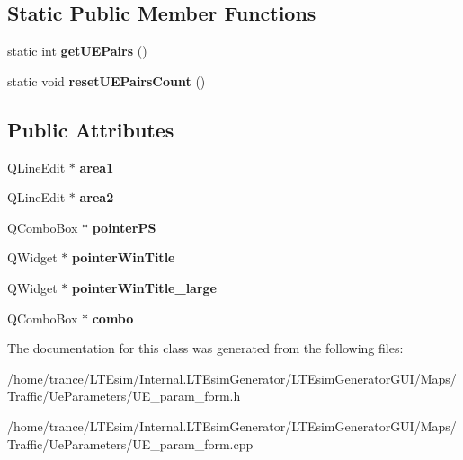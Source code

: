 \subsection*{Static Public Member Functions}
\begin{DoxyCompactItemize}
\item 
static int {\bfseries get\+U\+E\+Pairs} ()\hypertarget{class_form_a0450ccaddd3966be1b406167d1133739}{}\label{class_form_a0450ccaddd3966be1b406167d1133739}

\item 
static void {\bfseries reset\+U\+E\+Pairs\+Count} ()\hypertarget{class_form_ad56749806ce3cbddcbbda8c6efc8f79a}{}\label{class_form_ad56749806ce3cbddcbbda8c6efc8f79a}

\end{DoxyCompactItemize}
\subsection*{Public Attributes}
\begin{DoxyCompactItemize}
\item 
Q\+Line\+Edit $\ast$ {\bfseries area1}\hypertarget{class_form_aa6fff22a43be8b373d6a645a98b2a552}{}\label{class_form_aa6fff22a43be8b373d6a645a98b2a552}

\item 
Q\+Line\+Edit $\ast$ {\bfseries area2}\hypertarget{class_form_ae314659e50fb228cf30b9190bba945f2}{}\label{class_form_ae314659e50fb228cf30b9190bba945f2}

\item 
Q\+Combo\+Box $\ast$ {\bfseries pointer\+PS}\hypertarget{class_form_a58bdc0004144ecbd0cee33ae2a5b00c8}{}\label{class_form_a58bdc0004144ecbd0cee33ae2a5b00c8}

\item 
Q\+Widget $\ast$ {\bfseries pointer\+Win\+Title}\hypertarget{class_form_ab5ee7645699f72aa22d1787434f6b647}{}\label{class_form_ab5ee7645699f72aa22d1787434f6b647}

\item 
Q\+Widget $\ast$ {\bfseries pointer\+Win\+Title\+\_\+large}\hypertarget{class_form_ae745c744f4244f8a33ac804c8028af7d}{}\label{class_form_ae745c744f4244f8a33ac804c8028af7d}

\item 
Q\+Combo\+Box $\ast$ {\bfseries combo}\hypertarget{class_form_a8b03dc7e2564f1aeb7b0eb688f0e0655}{}\label{class_form_a8b03dc7e2564f1aeb7b0eb688f0e0655}

\end{DoxyCompactItemize}


The documentation for this class was generated from the following files\+:\begin{DoxyCompactItemize}
\item 
/home/trance/\+L\+T\+Esim/\+Internal.\+L\+T\+Esim\+Generator/\+L\+T\+Esim\+Generator\+G\+U\+I/\+Maps/\+Traffic/\+Ue\+Parameters/U\+E\+\_\+param\+\_\+form.\+h\item 
/home/trance/\+L\+T\+Esim/\+Internal.\+L\+T\+Esim\+Generator/\+L\+T\+Esim\+Generator\+G\+U\+I/\+Maps/\+Traffic/\+Ue\+Parameters/U\+E\+\_\+param\+\_\+form.\+cpp\end{DoxyCompactItemize}
